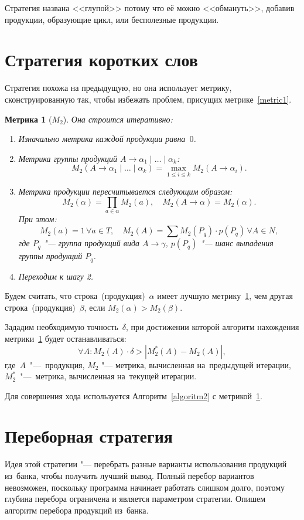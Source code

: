 \documentclass{csmathnotes}
\newtheorem{metric}{Метрика}
\begin{document}
Стратегия названа <<глупой>> потому что её можно <<обмануть>>, добавив продукции, образующие цикл, или бесполезные продукции.

\section*{Стратегия коротких слов}

Стратегия похожа на предыдущую, но она использует метрику, сконструированную так, чтобы избежать проблем, присущих метрике~\ref{metric1}.

\begin{metric}[$M_2$]
	\label{metric2}
	Она строится итеративно:
	\begin{enumerate}
		\item Изначально метрика каждой продукции равна~$0$.
		
		\item Метрика группы продукций $A \rightarrow \alpha_1\mid \ldots \mid \alpha_k$: \[M_2(A \rightarrow \alpha_1\mid\ldots\mid\alpha_k)=\max_{1 \leqslant i \leqslant k}M_2(A\rightarrow\alpha_i).\]
		
		\item Метрика продукции пересчитывается следующим образом: \[M_2(\alpha)=\prod_{a \in \alpha}M_2(a), \quad M_2(A \rightarrow \alpha)=M_2(\alpha).\] При этом: \[M_2(a)=1\,\forall a \in T, \quad M_2(A)=\sum M_2(P_q)\cdot p(P_q)\,\forall A \in N,\] где $P_q$ "--- группа продукций вида $A \rightarrow \gamma$, $p(P_q)$ "--- шанс выпадения группы продукций $P_q$.
		
		\item Переходим к шагу 2.
	\end{enumerate}
\end{metric}

Будем считать, что строка~(продукция)~$\alpha$ имеет лучшую метрику~\ref{metric2}, чем другая строка~(продукция)~$\beta$, если $M_2(\alpha)> M_2(\beta)$.

Зададим необходимую точность~$\delta$, при достижении которой алгоритм нахождения метрики~\ref{metric2} будет останавливаться: \[\forall A: M_2(A)\cdot\delta > |M_2^*(A) - M_2(A)|,\] где~$A$~"---~продукция, $M_2$ "--- метрика, вычисленная на~предыдущей итерации, $M_2^*$~"---~метрика, вычисленная на~текущей итерации.

Для совершения хода используется Алгоритм~\ref{algoritm2} с метрикой~\ref{metric2}.

\section*{Переборная стратегия}
Идея этой стратегии "--- перебрать разные варианты использования продукций из~банка, чтобы получить лучший вывод. Полный перебор вариантов невозможен, поскольку программа начинает работать слишком долго, поэтому глубина перебора ограничена и является параметром стратегии. Опишем алгоритм перебора продукций из~банка.
\end{document}
